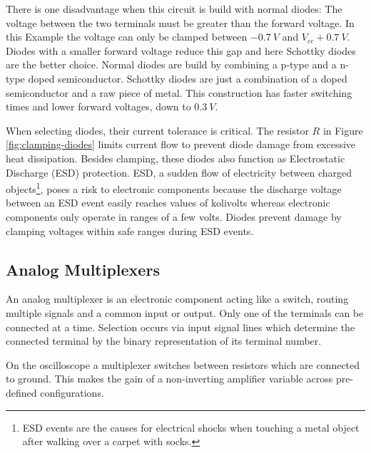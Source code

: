 There is one disadvantage when this circuit is build with normal diodes: The voltage between the two terminals must be greater than the forward voltage. In this Example the voltage can only be clamped between $\SI{-0,7}{V}$ and $V_{cc} + \SI{0,7}{V}$. Diodes with a smaller forward voltage reduce this gap and here Schottky diodes are the better choice. Normal diodes are build by combining a p-type and a n-type doped semiconductor. Schottky diodes are just a combination of a doped semiconductor and a raw piece of metal. This construction has faster switching times and lower forward voltages, down to $\SI{0,3}{V}$.

When selecting diodes, their current tolerance is critical. The resistor $R$ in Figure \ref{fig:clamping-diodes} limits current flow to prevent diode damage from excessive heat dissipation. Besides clamping, these diodes also function as Electrostatic Discharge (ESD) protection. ESD, a sudden flow of electricity between charged objects\footnote{ESD events are the causes for electrical shocks when touching a metal object after walking over a carpet with socks.}, poses a risk to electronic components because the discharge voltage between an ESD event easily reaches values of kolivolts whereas electronic components only operate in ranges of a few volts. Diodes prevent damage by clamping voltages within safe ranges during ESD events.

\subsection{Analog Multiplexers}

An analog multiplexer is an electronic component acting like a switch, routing multiple signals and a common input or output. Only one of the terminals can be connected at a time. Selection occurs via input signal lines which determine the connected terminal by the binary representation of its terminal number.

On the oscilloscope a multiplexer switches between resistors which are connected to ground. This makes the gain of a non-inverting amplifier variable across pre-defined configurations.
